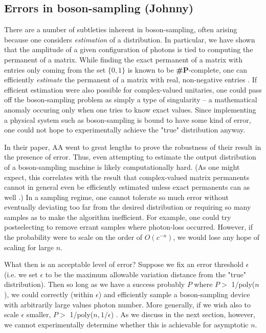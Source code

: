 \documentclass[aps,pra,twocolumn,amsmath,amssymb,nofootinbib,superscriptaddress]{revtex4}
\begin{document}
\subsection{Errors in boson-sampling (Johnny)}

There are a number of subtleties inherent in boson-sampling, often arising because one considers \textit{estimation} of a distribution.  In particular, we have shown that the amplitude of a given configuration of photons is tied to computing the permanent of a matrix.  While finding the exact permanent of a matrix with entries only coming from the set $\{0,1\}$ is known to be \textbf{\#P}-complete, one can efficiently \textit{estimate} the permanent of a matrix with real, non-negative entries \cite{bib:Valiant79,bib:Jerrum04}.  If efficient estimation were also possible for complex-valued unitaries, one could pass off the boson-sampling problem as simply a type of singularity -- a mathematical anomaly occuring only when one tries to know exact values.  Since implementing a physical system such as boson-sampling is bound to have some kind of error, one could not hope to experimentally achieve the "true" distribution anyway.

In their paper, AA went to great lengths to prove the robustness of their result in the presence of error.  Thus, even attempting to estimate the output distribution of a boson-sampling machine is likely computationally hard.  (As one might expect, this correlates with the result that complex-valued matrix permanents cannot in general even be efficiently estimated unless exact permanents can as well \cite{bib:Jerrum04}.)  In a sampling regime, one cannot tolerate so much error without eventually deviating too far from the desired distribution or requiring so many samples as to make the algorithm inefficient.  For example, one could try postselecting to remove errant samples where photon-loss occurred.  However, if the probability  were to scale on the order of $O(c^{-n})$, we would lose any hope of scaling for large $n$.

What then is an acceptable level of error?  Suppose we fix an error threshold $\epsilon$ (i.e. we set $\epsilon$ to be the maximum allowable variation distance from the "true" distribution).  Then so long as we have a success probably $P$ where $P>$ 1/poly($n$), we could correctly (within $\epsilon$) and efficiently sample a boson-sampling device with arbitrarily large values photon number.  More generally, if we wish also to scale $\epsilon$ smaller, $P>$ 1/poly($n,1/\epsilon$) \cite{aar}. As we discuss in the next section, however, we cannot experimentally determine whether this is achievable for asymptotic $n$.
\end{document}
